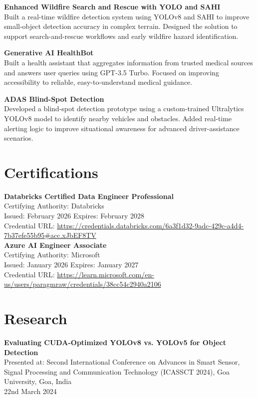\documentclass[a4paper,10pt]{article}
\begin{document}
\vspace{1mm}

\textbf{Enhanced Wildfire Search and Rescue with YOLO and SAHI} \\
Built a real-time wildfire detection system using YOLOv8 and SAHI to improve small-object detection accuracy in complex terrain. Designed the solution to support search-and-rescue workflows and early wildfire hazard identification.

\vspace{1mm}

\textbf{Generative AI HealthBot} \\
Built a health assistant that aggregates information from trusted medical sources and answers user queries using GPT-3.5 Turbo. Focused on improving accessibility to reliable, easy-to-understand medical guidance.

\vspace{1mm}

\textbf{ADAS Blind-Spot Detection} \\
Developed a blind-spot detection prototype using a custom-trained Ultralytics YOLOv8 model to identify nearby vehicles and obstacles. Added real-time alerting logic to improve situational awareness for advanced driver-assistance scenarios.

\section*{Certifications}
\vspace{1mm}
\textbf{Databricks Certified Data Engineer Professional} \\
Certifying Authority: Databricks \\
Issued: February 2026 \quad Expires: February 2028 \\
Credential URL: \url{https://credentials.databricks.com/6a3f1d32-9adc-429c-a4d4-7b37efe55b95#acc.xJbEF8TV} \\
\textbf{Azure AI Engineer Associate} \\
Certifying Authority: Microsoft \\
Issued: January 2026 \quad Expires: January 2027 \\
Credential URL: \url{https://learn.microsoft.com/en-us/users/paragmraw/credentials/38cc54c2940a2106} \\

\section*{Research}
\vspace{1mm}
\textbf{Evaluating CUDA-Optimized YOLOv8 vs. YOLOv5 for Object Detection} \\
Presented at: Second International Conference on Advances in Smart Sensor, Signal Processing and Communication Technology (ICASSCT 2024), Goa University, Goa, India \\
22nd March 2024
\end{document}
